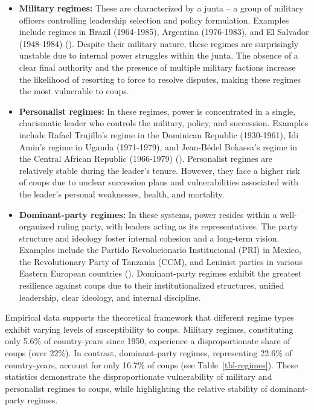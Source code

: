 \documentclass[
  12pt,
]{report}
\begin{document}
\begin{itemize}
\item
  \textbf{Military regimes:} These are characterized by a junta -- a
  group of military officers controlling leadership selection and policy
  formulation. Examples include regimes in Brazil (1964-1985), Argentina
  (1976-1983), and El Salvador (1948-1984)
  (). Despite their military
  nature, these regimes are surprisingly unstable due to internal power
  struggles within the junta. The absence of a clear final authority and
  the presence of multiple military factions increase the likelihood of
  resorting to force to resolve disputes, making these regimes the most
  vulnerable to coups.
\item
  \textbf{Personalist regimes:} In these regimes, power is concentrated
  in a single, charismatic leader who controls the military, policy, and
  succession. Examples include Rafael Trujillo's regime in the Dominican
  Republic (1930-1961), Idi Amin's regime in Uganda (1971-1979), and
  Jean-Bédel Bokassa's regime in the Central African Republic
  (1966-1979) (). Personalist
  regimes are relatively stable during the leader's tenure. However,
  they face a higher risk of coups due to unclear succession plans and
  vulnerabilities associated with the leader's personal weaknesses,
  health, and mortality.
\item
  \textbf{Dominant-party regimes:} In these systems, power resides
  within a well-organized ruling party, with leaders acting as its
  representatives. The party structure and ideology foster internal
  cohesion and a long-term vision. Examples include the Partido
  Revolucionario Institucional (PRI) in Mexico, the Revolutionary Party
  of Tanzania (CCM), and Leninist parties in various Eastern European
  countries (). Dominant-party
  regimes exhibit the greatest resilience against coups due to their
  institutionalized structures, unified leadership, clear ideology, and
  internal discipline.
\end{itemize}

Empirical data supports the theoretical framework that different regime
types exhibit varying levels of susceptibility to coups. Military
regimes, constituting only 5.6\% of country-years since 1950, experience
a disproportionate share of coups (over 22\%). In contrast,
dominant-party regimes, representing 22.6\% of country-years, account
for only 16.7\% of coups (see Table~\ref{tbl-regimes}). These statistics
demonstrate the disproportionate vulnerability of military and
personalist regimes to coups, while highlighting the relative stability
of dominant-party regimes.
\end{document}
